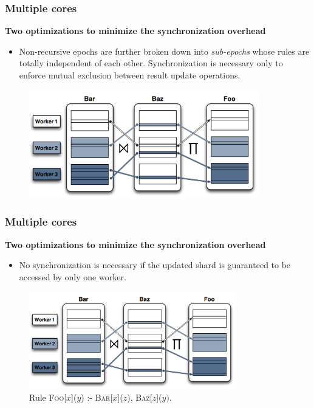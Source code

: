 \documentclass{beamer}
\begin{document}
\frame
{
	\frametitle{Multiple cores}
	
	\textbf{Two optimizations to minimize the synchronization overhead}
	\begin{itemize}
		\item Non-recursive epochs are further broken down into \textit{sub-epochs} whose rules are totally independent of each other. Synchronization is necessary only to enforce mutual exclusion between result update operations.
	\end{itemize}
	
	\begin{figure}
		\centering
		\includegraphics[width=10cm]{parallel_evaluation.png}
	\end{figure}
}

\frame
{
	\frametitle{Multiple cores}
	
	\textbf{Two optimizations to minimize the synchronization overhead}
	\begin{itemize}
		\item No synchronization is necessary if the updated shard is guaranteed to be accessed by only one worker.
	\end{itemize}
	
	\begin{figure}
		\centering
		\includegraphics[width=9cm]{parallel_evaluation.png}
		\caption{Rule \textsc{Foo}[$x$]($y$) :- \textsc{Bar}[$x$]($z$), \textsc{Baz}[$z$]($y)$.  }
	\end{figure}
}
\end{document}
